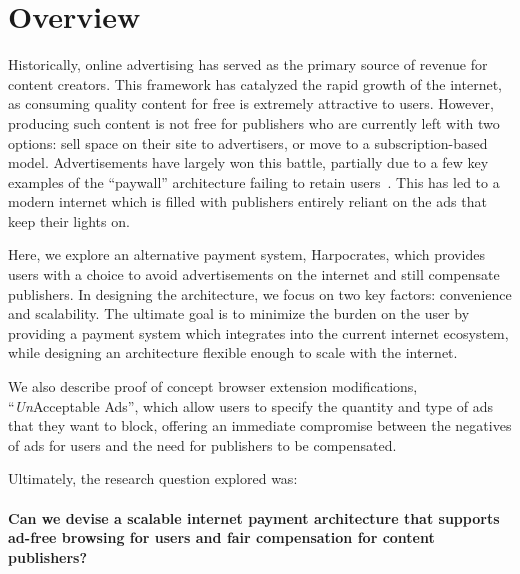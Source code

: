 
\section{Overview}
Historically, online advertising has served as the primary source of revenue for content creators.
This framework has catalyzed the rapid growth of the internet, as consuming quality content for free is extremely attractive to users.
However, producing such content is not free for publishers who are currently left with two options: sell space on their site to advertisers, or move to a subscription-based model.
Advertisements have largely won this battle, partially due to a few key examples of the “paywall” architecture failing to retain users~\cite{nyt}.
This has led to a modern internet which is filled with publishers entirely reliant on the ads that keep their lights on.

Here, we explore an alternative payment system, Harpocrates, which provides users with a choice to avoid advertisements on the internet and still compensate publishers.
In designing the architecture, we focus on two key factors: convenience and scalability.
The ultimate goal is to minimize the burden on the user by providing a payment system which integrates into the current internet ecosystem, while designing an architecture flexible enough to scale with the internet.

We also describe proof of concept browser extension modifications, ``\textit{Un}Acceptable Ads'', which allow users to specify the quantity and type of ads that they want to block, offering an immediate compromise between the negatives of ads for users and the need for publishers to be compensated.

Ultimately, the research question explored was: \\
\\
\textbf{Can we devise a scalable internet payment architecture that supports ad-free browsing for users and fair compensation for content publishers?}
